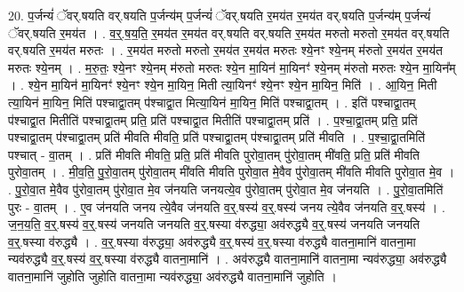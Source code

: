 \documentclass[17pt]{extarticle}
\begin{document}
20. प॒र्जन्यं॑ ॅवर्.षयति वर्.षयति प॒र्जन्य॑म् प॒र्जन्यं॑ ॅवर्.षयति र॒मय॑त र॒मय॑त वर्.षयति प॒र्जन्य॑म् प॒र्जन्यं॑ ॅवर्.षयति र॒मय॑त । . व॒र्॒.ष॒य॒ति॒ र॒मय॑त र॒मय॑त वर्.षयति वर्.षयति र॒मय॑त मरुतो मरुतो र॒मय॑त वर्.षयति वर्.षयति र॒मय॑त मरुतः । . र॒मय॑त मरुतो मरुतो र॒मय॑त र॒मय॑त मरुतः श्ये॒नꣳ श्ये॒नम् म॑रुतो र॒मय॑त र॒मय॑त मरुतः श्ये॒नम् । . म॒रु॒तः॒ श्ये॒नꣳ श्ये॒नम् म॑रुतो मरुतः श्ये॒न मा॒यिन॑ मा॒यिनꣳ॑ श्ये॒नम् म॑रुतो मरुतः श्ये॒न मा॒यिन᳚म् । . श्ये॒न मा॒यिन॑ मा॒यिनꣳ॑ श्ये॒नꣳ श्ये॒न मा॒यिन॒ मिती त्या॒यिनꣳ॑ श्ये॒नꣳ श्ये॒न मा॒यिन॒ मिति॑ । . आ॒यिन॒ मिती त्या॒यिन॑ मा॒यिन॒ मिति॑ पश्चाद्वा॒तम् प॑श्चाद्वा॒त मित्या॒यिन॑ मा॒यिन॒ मिति॑ पश्चाद्वा॒तम् । . इति॑ पश्चाद्वा॒तम् प॑श्चाद्वा॒त मितीति॑ पश्चाद्वा॒तम् प्रति॒ प्रति॑ पश्चाद्वा॒त मितीति॑ पश्चाद्वा॒तम् प्रति॑ । . प॒श्चा॒द्वा॒तम् प्रति॒ प्रति॑ पश्चाद्वा॒तम् प॑श्चाद्वा॒तम् प्रति॑ मीवति मीवति॒ प्रति॑ पश्चाद्वा॒तम् प॑श्चाद्वा॒तम् प्रति॑ मीवति । . प॒श्चा॒द्वा॒तमिति॑ पश्चात् - वा॒तम् । . प्रति॑ मीवति मीवति॒ प्रति॒ प्रति॑ मीवति पुरोवा॒तम् पु॑रोवा॒तम् मी॑वति॒ प्रति॒ प्रति॑ मीवति पुरोवा॒तम् । . मी॒व॒ति॒ पु॒रो॒वा॒तम् पु॑रोवा॒तम् मी॑वति मीवति पुरोवा॒त मे॒वैव पु॑रोवा॒तम् मी॑वति मीवति पुरोवा॒त मे॒व । . पु॒रो॒वा॒त मे॒वैव पु॑रोवा॒तम् पु॑रोवा॒त मे॒व ज॑नयति जनयत्ये॒व पु॑रोवा॒तम् पु॑रोवा॒त मे॒व ज॑नयति । . पु॒रो॒वा॒तमिति॑ पुरः - वा॒तम् । . ए॒व ज॑नयति जनय त्ये॒वैव ज॑नयति व॒र्॒.षस्य॑ व॒र्॒.षस्य॑ जनय त्ये॒वैव ज॑नयति व॒र्॒.षस्य॑ । . ज॒न॒य॒ति॒ व॒र्॒.षस्य॑ व॒र्॒.षस्य॑ जनयति जनयति व॒र्॒.षस्या व॑रुद्ध्या॒ अव॑रुद्ध्यै व॒र्॒.षस्य॑ जनयति जनयति व॒र्॒.षस्या व॑रुद्ध्यै । . व॒र्॒.षस्या व॑रुद्ध्या॒ अव॑रुद्ध्यै व॒र्॒.षस्य॑ व॒र्॒.षस्या व॑रुद्ध्यै वातना॒मानि॑ वातना॒मा न्यव॑रुद्ध्यै व॒र्॒.षस्य॑ व॒र्॒.षस्या व॑रुद्ध्यै वातना॒मानि॑ । . अव॑रुद्ध्यै वातना॒मानि॑ वातना॒मा न्यव॑रुद्ध्या॒ अव॑रुद्ध्यै वातना॒मानि॑ जुहोति जुहोति वातना॒मा न्यव॑रुद्ध्या॒ अव॑रुद्ध्यै वातना॒मानि॑ जुहोति । \newline
\end{document}
